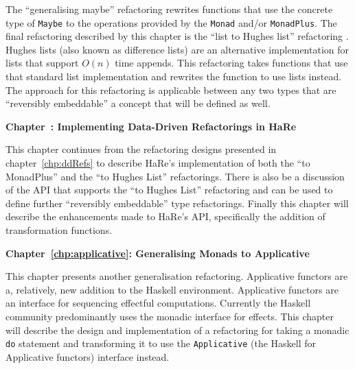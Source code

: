 The ``generalising maybe'' refactoring \DIFaddbegin {}\DIFaddend rewrites functions that use the concrete type of \texttt{Maybe} to \DIFdelbegin {}\DIFdelend \DIFaddbegin {}\DIFaddend the operations provided by the \DIFdelbegin {}\DIFdelend \DIFaddbegin {}\DIFaddend \texttt{Monad} and/or \texttt{MonadPlus}. The final refactoring described by this chapter is the ``list to Hughes list'' refactoring \DIFaddbegin {}\DIFaddend . Hughes lists (also known as difference lists) are an alternative implementation for lists that support $O(n)$ time appends. This refactoring takes functions that use that standard list implementation and rewrites the function to use \DIFdelbegin {}\DIFdelend \DIFaddbegin {}\DIFaddend lists instead. The approach for this refactoring is applicable between any two types that are ``reversibly embeddable'' a concept that will be defined as well.

\textbf{Chapter~\DIFdelbegin \DIFdel{\ref{generalImp}}\DIFdelend \DIFaddbegin \DIFadd{\ref{chp:generalImp}}\DIFaddend : Implementing Data-Driven Refactorings in HaRe}

This chapter continues \DIFdelbegin {}\DIFdelend from the refactoring designs presented in chapter~\ref{chp:ddRefs} to describe HaRe's implementation of both the ``\DIFdelbegin {}\DIFdelend \DIFaddbegin {}\DIFaddend to MonadPlus'' and the ``\DIFdelbegin {}\DIFdelend \DIFaddbegin {}\DIFaddend to Hughes List'' refactorings. There is also be a discussion of the API that  supports the ``\DIFdelbegin {}\DIFdelend \DIFaddbegin {}\DIFaddend to Hughes List'' refactoring and can be used to define further ``reversibly embeddable'' type refactorings. Finally this chapter will describe the enhancements made to HaRe's API, specifically the addition of \DIFdelbegin {}\DIFdelend \DIFaddbegin {}\DIFaddend transformation functions.

\textbf{Chapter~\ref{chp:applicative}: Generalising Monads to Applicative}

This chapter presents another generalisation refactoring. Applicative functors are a, relatively, new addition to the Haskell environment. Applicative functors are an interface for sequencing effectful computations. Currently the Haskell community predominantly uses the monadic interface for effects. This chapter will describe the design and implementation of a refactoring for taking a monadic \texttt{do} statement and transforming it to use the \texttt{Applicative} (the Haskell \DIFdelbegin {}\DIFdelend \DIFaddbegin {}\DIFaddend for Applicative functors) interface instead.

